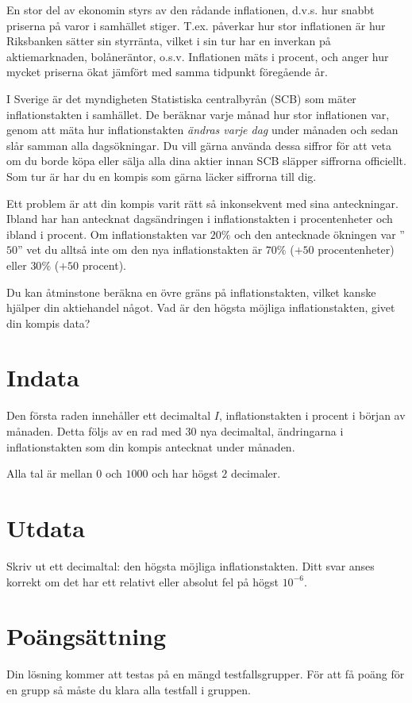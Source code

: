 En stor del av ekonomin styrs av den rådande inflationen, d.v.s. hur snabbt priserna på varor i samhället stiger.
T.ex. påverkar hur stor inflationen är hur Riksbanken sätter sin styrränta, vilket i sin tur har en inverkan på aktiemarknaden, bolåneräntor, o.s.v.
Inflationen mäts i procent, och anger hur mycket priserna ökat jämfört med samma tidpunkt föregående år.

I Sverige är det myndigheten Statistiska centralbyrån (SCB) som mäter inflationstakten i samhället.
De beräknar varje månad hur stor inflationen var, genom att mäta hur inflationstakten \emph{ändras varje dag} under månaden och sedan slår samman alla dagsökningar.
Du vill gärna använda dessa siffror för att veta om du borde köpa eller sälja alla dina aktier innan SCB släpper siffrorna officiellt.
Som tur är har du en kompis som gärna läcker siffrorna till dig.

Ett problem är att din kompis varit rätt så inkonsekvent med sina anteckningar.
Ibland har han antecknat dagsändringen i inflationstakten i procentenheter och ibland i procent.
Om inflationstakten var $20\%$ och den antecknade ökningen var ''$50$'' vet du alltså inte om den nya inflationstakten är $70\%$ ($+50$ procentenheter) eller $30\%$ ($+50$ procent).

Du kan åtminstone beräkna en övre gräns på inflationstakten, vilket kanske hjälper din aktiehandel något.
Vad är den högsta möjliga inflationstakten, givet din kompis data?

\section*{Indata}
Den första raden innehåller ett decimaltal $I$, inflationstakten i procent i början av månaden.
Detta följs av en rad med $30$ nya decimaltal, ändringarna i inflationstakten som din kompis antecknat under månaden.

Alla tal är mellan $0$ och $1000$ och har högst $2$ decimaler.


\section*{Utdata}
Skriv ut ett decimaltal: den högsta möjliga inflationstakten.
Ditt svar anses korrekt om det har ett relativt eller absolut fel på högst $10^{-6}$.

\section*{Poängsättning}
Din lösning kommer att testas på en mängd testfallsgrupper.
För att få poäng för en grupp så måste du klara alla testfall i gruppen.

